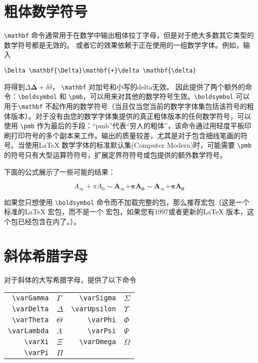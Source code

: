 \section{粗体数学符号}
\verb|\mathbf| 命令通常用于在数学中输出粗体拉丁字母，但是对于绝大多数其它类型的数学符号都是无效的。 或者它的效果依赖于正在使用的一组数学字体。例如，输入
\begin{verbatim}
\Delta \mathbf{\Delta}\mathbf{+}\delta \mathbf{\delta}
\end{verbatim}
将得到$\Delta \mathbf{\Delta}+\delta\delta$，  \verb|\mathbf| 对加号和小写的delta无效。 因此提供了两个额外的命令：\verb|\boldsymbol| 和 \verb|\pmb|，可以用来对其他的数学符号生效。\verb|\boldsymbol| 可以用于\verb|\mathbf| 不起作用的数学符号（当且仅当您当前的数学字体集包括该符号的粗体版本）。对于没有由您的数学字体集提供的真正粗体版本的任何数学符号，可以使用 \verb|\pmb| 作为最后的手段：“pmb”代表“穷人的粗体”，该命令通过用轻度平板印刷打印符号的多个副本来工作。输出的质量较差，尤其是对于包含细线笔画的符号。当使用\LaTeX{} 数学字体的标准默认集(Computer Modern)时，可能需要 \verb|\pmb| 的符号只有大型运算符符号，扩展定界符符号或包\cite{8}提供的额外数学符号。

下面的公式展示了一些可能的结果：
\begin{tcblisting}{}
\[
A_\infty+ \pi A_0
\sim \mathbf{A}_{\boldsymbol{\infty}} \boldsymbol{+}
  \boldsymbol{\pi} \mathbf{A}_{\boldsymbol{0}}
\sim\pmb{A}_{\pmb{\infty}} \pmb{+}\pmb{\pi} \pmb{A}_{\pmb{0}}
\]
\end{tcblisting}

如果您只想使用 \verb|\boldsymbol| 命令而不加载完整的包，那么推荐宏包（这是一个标准的\LaTeX{} 宏包，而不是一个  宏包，如果您有1997或者更新的\LaTeX{} 版本，这个包已经包含在内了。）。
\section{斜体希腊字母}
对于斜体的大写希腊字母，提供了以下命令
\begin{center}
\begin{tabular}{rlrl}
\verb|\varGamma|&$\varGamma$&\verb|\varSigma|&$\varSigma$\\
\verb|\varDelta|&$\varDelta$&\verb|\varUpsilon|&$\varUpsilon$\\
\verb|\varTheta|&$\varTheta$&\verb|\varPhi|&$\varPhi$\\
\verb|\varLambda|&$\varLambda$&\verb|\varPsi|&$\varPsi$\\
\verb|\varXi|&$\varXi$&\verb|\varOmega|&$\varOmega$\\
\verb|\varPi|&$\varPi$&&
\end{tabular}
\end{center}